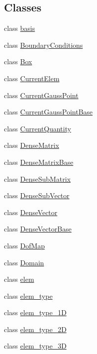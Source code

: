 \subsection*{Classes}
\begin{DoxyCompactItemize}
\item 
class \mbox{\hyperlink{classfemus_1_1basis}{basis}}
\item 
class \mbox{\hyperlink{classfemus_1_1_boundary_conditions}{Boundary\+Conditions}}
\item 
class \mbox{\hyperlink{classfemus_1_1_box}{Box}}
\item 
class \mbox{\hyperlink{classfemus_1_1_current_elem}{Current\+Elem}}
\item 
class \mbox{\hyperlink{classfemus_1_1_current_gauss_point}{Current\+Gauss\+Point}}
\item 
class \mbox{\hyperlink{classfemus_1_1_current_gauss_point_base}{Current\+Gauss\+Point\+Base}}
\item 
class \mbox{\hyperlink{classfemus_1_1_current_quantity}{Current\+Quantity}}
\item 
class \mbox{\hyperlink{classfemus_1_1_dense_matrix}{Dense\+Matrix}}
\item 
class \mbox{\hyperlink{classfemus_1_1_dense_matrix_base}{Dense\+Matrix\+Base}}
\item 
class \mbox{\hyperlink{classfemus_1_1_dense_sub_matrix}{Dense\+Sub\+Matrix}}
\item 
class \mbox{\hyperlink{classfemus_1_1_dense_sub_vector}{Dense\+Sub\+Vector}}
\item 
class \mbox{\hyperlink{classfemus_1_1_dense_vector}{Dense\+Vector}}
\item 
class \mbox{\hyperlink{classfemus_1_1_dense_vector_base}{Dense\+Vector\+Base}}
\item 
class \mbox{\hyperlink{classfemus_1_1_dof_map}{Dof\+Map}}
\item 
class \mbox{\hyperlink{classfemus_1_1_domain}{Domain}}
\item 
class \mbox{\hyperlink{classfemus_1_1elem}{elem}}
\item 
class \mbox{\hyperlink{classfemus_1_1elem__type}{elem\+\_\+type}}
\item 
class \mbox{\hyperlink{classfemus_1_1elem__type__1_d}{elem\+\_\+type\+\_\+1D}}
\item 
class \mbox{\hyperlink{classfemus_1_1elem__type__2_d}{elem\+\_\+type\+\_\+2D}}
\item 
class \mbox{\hyperlink{classfemus_1_1elem__type__3_d}{elem\+\_\+type\+\_\+3D}}

\end{DoxyCompactItemize}
